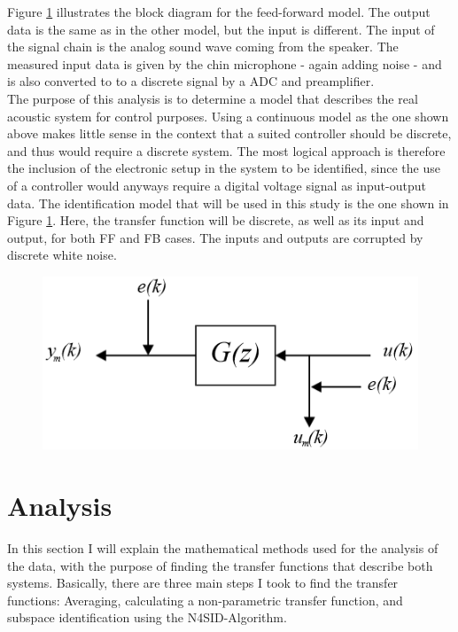Figure \ref{} illustrates the block diagram for the feed-forward model. The output data is the same as in the other model, but the input is different. The input of the signal chain is the analog sound wave coming from the speaker. The measured input data is given by the chin microphone - again adding noise - and is also converted to to a discrete signal by a ADC and preamplifier.\\

The purpose of this analysis is to determine a model that describes the real acoustic system for control purposes. Using a continuous model as the one shown above makes little sense in the context that a suited controller should be discrete, and thus would require a discrete system. The most logical approach is therefore the inclusion of the electronic setup in the system to be identified, since the use of a controller would anyways require a digital voltage signal as input-output data. The identification model that will be used in this study is the one shown in Figure \ref{}. Here, the transfer function will be discrete, as well as its input and output, for both FF and FB cases. The inputs and outputs are corrupted by discrete white noise.

  \begin{figure}[H]
\centering
\includegraphics[width=1.0\textwidth]{pics/discrete_model}
\caption{}
\label{pic:}
\end{figure}



\section{Analysis}

In this section I will explain the mathematical methods used for the analysis of the data, with the purpose of finding the transfer functions that describe both systems. Basically, there are three main steps I took to find the transfer functions: Averaging, calculating a non-parametric transfer function, and subspace identification using the N4SID-Algorithm.\\

